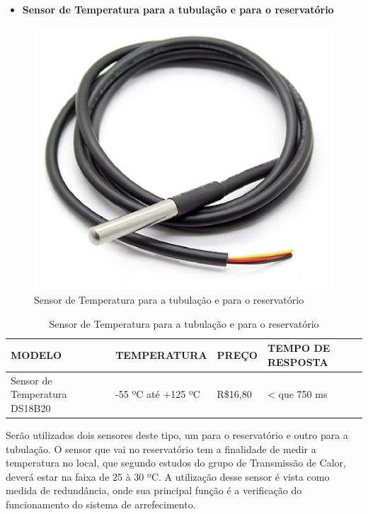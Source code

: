 \begin{itemize}
    \item \textbf{Sensor de Temperatura para a tubulação e para o reservatório}
\end{itemize}
\begin{figure}[!htb]                  
	\centering                          
	\includegraphics[scale=0.5]{figuras/Figura4.eps}
	\caption{ Sensor de Temperatura para a tubulação e para o reservatório }             
\end{figure}

\begin{table}[]
    \centering
    \begin{tabular}{|p{3cm}|p{5cm}|p{3cm}|p{3cm}|}
    \hline
    \textbf{MODELO} & \textbf{TEMPERATURA}    & \textbf{PREÇO} & \textbf{TEMPO DE RESPOSTA} \\ \hline
    Sensor de Temperatura DS18B20      & -55 ºC até +125 ºC &  R\$16,80 & < que 750 ms  \\ \hline
    \end{tabular}
    \caption{Sensor de Temperatura para a tubulação e para o reservatório}
    \end{table}

Serão utilizados dois sensores deste tipo, um para o reservatório e outro para a tubulação. O sensor que vai no reservatório tem a finalidade de medir a temperatura no local, que segundo estudos do grupo de Transmissão de Calor, deverá estar na faixa de 25 à 30 ºC. A utilização desse sensor é vista como medida de redundância, onde sua principal função é a verificação do funcionamento do sistema de arrefecimento. 

